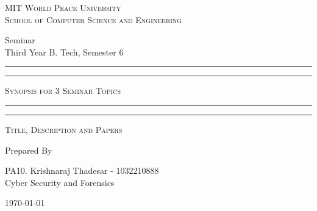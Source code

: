 \documentclass[11pt]{article}
\begin{document}
\begin{titlepage}
    \centering


    \huge\textsc{
        MIT World Peace University\\
        School of Computer Science and Engineering
    }\\

    \vspace{0.75\baselineskip} %

    \LARGE{
        Seminar\\
        Third Year B. Tech, Semester 6
    }

    \vfill %


    \rule{\textwidth}{1.6pt}\vspace*{-\baselineskip}\vspace*{2pt}
    \rule{\textwidth}{0.6pt}
    \vspace{0.75\baselineskip} %



    \huge{\textsc{
        Synopsis for 3 Seminar Topics 
    }} \\



    \vspace{0.5\baselineskip} %
    \rule{\textwidth}{0.6pt}\vspace*{-\baselineskip}\vspace*{2.8pt}
    \rule{\textwidth}{1.6pt}

    \vspace{1\baselineskip} %


    \LARGE\textsc{
        Title, Description and Papers\\
    } %
    \vfill


    Prepared By
    \vspace{0.5\baselineskip} %

    \Large{
        PA10. Krishnaraj Thadesar - 1032210888\\
        Cyber Security and Forensics\\
    }


    \vspace{0.5\baselineskip} %
    \today

\end{titlepage}
\end{document}
